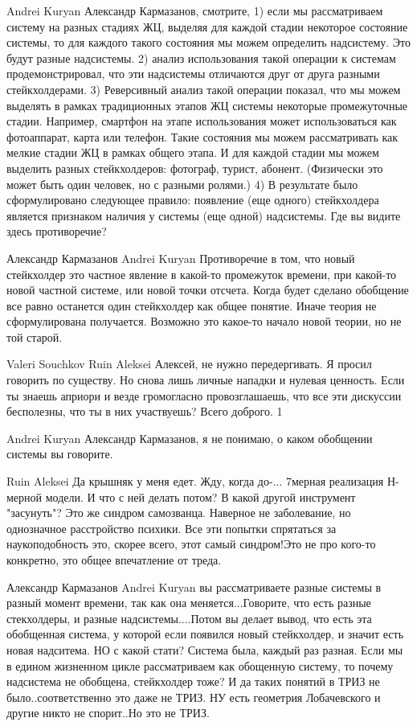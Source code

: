\documentclass[11pt,a4paper]{article}
\begin{document}
Andrei Kuryan Александр Кармазанов, смотрите, 1) если мы рассматриваем систему
на разных стадиях ЖЦ, выделяя для каждой стадии некоторое состояние системы,
то для каждого такого состояния мы можем определить надсистему. Это будут
разные надсистемы.  2) анализ использования такой операции к системам
продемонстрировал, что эти надсистемы отличаются друг от друга разными
стейкхолдерами.  3) Реверсивный анализ такой операции показал, что мы можем
выделять в рамках традиционных этапов ЖЦ системы некоторые промежуточные
стадии. Например, смартфон на этапе использования может использоваться как
фотоаппарат, карта или телефон. Такие состояния мы можем рассматривать как
мелкие стадии ЖЦ в рамках общего этапа. И для каждой стадии мы можем выделить
разных стейкхолдеров: фотограф, турист, абонент. (Физически это может быть
один человек, но с разными ролями.)  4) В результате было сформулировано
следующее правило: появление (еще одного) стейкхолдера является признаком
наличия у системы (еще одной) надсистемы.  Где вы видите здесь противоречие?

Александр Кармазанов Andrei Kuryan Противоречие в том, что новый стейкхолдер
это частное явление в какой-то промежуток времени, при какой-то новой частной
системе, или новой точки отсчета. Когда будет сделано обобщение все равно
останется один стейкхолдер как общее понятие. Иначе теория не сформулирована
получается. Возможно это какое-то начало новой теории, но не той старой.

Valeri Souchkov Ruin Aleksei Алексей, не нужно передергивать. Я просил
говорить по существу. Но снова лишь личные нападки и нулевая ценность. Если ты
знаешь априори и везде громогласно провозглашаешь, что все эти дискуссии
бесполезны, что ты в них участвуешь? Всего доброго.  1

Andrei Kuryan Александр Кармазанов, я не понимаю, о каком обобщении системы вы
говорите.

Ruin Aleksei Да крышняк у меня едет. Жду, когда до-... 7мерная реализация
Н-мерной модели. И что с ней делать потом? В какой другой инструмент
"засунуть"? Это же синдром самозванца. Наверное не заболевание, но однозначное
расстройство психики. Все эти попытки спрятаться за наукоподобность это,
скорее всего, этот самый синдром!Это не про кого-то конкретно, это общее
впечатление от треда.

Александр Кармазанов Andrei Kuryan вы рассматриваете разные системы в разный
момент времени, так как она меняется...Говорите, что есть разные стекхолдеры,
и разные надсистемы....Потом вы делает вывод, что есть эта обобщенная система,
у которой если появился новый стейкхолдер, и значит есть новая надситема. НО с
какой стати? Система была, каждый раз разная. Если мы в едином жизненном цикле
рассматриваем как обощенную систему, то почему надсистема не обобщена,
стейкхолдер тоже? И да таких понятий в ТРИЗ не было..соответственно это даже
не ТРИЗ.  НУ есть геометрия Лобачевского и другие никто не спорит..Но это не
ТРИЗ.
\end{document}
